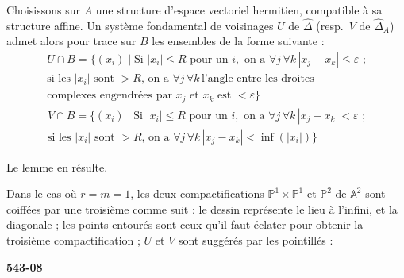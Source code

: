 \documentclass[12pt,a4paper]{article}
\begin{document}
Choisissons sur $A$ une structure d'espace vectoriel hermitien, compatible à sa structure affine. Un système fondamental de voisinages $U$ de $\widehat{\Delta}$ (resp.\ $V$ de $\widehat{\Delta}_A$) admet alors pour trace sur $B$ les ensembles de la forme suivante :
\begin{multline*}
U \cap B = \{(x_i) \mid \text{Si } |x_i| \leq R \text{ pour un } i, \text{ on a } \forall j\, \forall k\, |x_j - x_k| \leq \varepsilon \text{ ;} \\
\text{si les } |x_i| \text{ sont } > R \text{, on a } \forall j\, \forall k\, \text{l'angle entre les droites} \\
\text{complexes engendrées par } x_j \text{ et } x_k \text{ est } < \varepsilon\}
\end{multline*}
\begin{multline*}
V \cap B = \{(x_i) \mid \text{Si } |x_i| \leq R \text{ pour un } i, \text{ on a } \forall j\, \forall k\, |x_j - x_k| < \varepsilon \text{ ;} \\
\text{si les } |x_i| \text{ sont } > R \text{, on a } \forall j\, \forall k\, |x_j - x_k| < \inf(|x_i|)\}
\end{multline*}

Le lemme en résulte.

Dans le cas où $r = m = 1$, les deux compactifications $\mathbb{P}^1 \times \mathbb{P}^1$ et $\mathbb{P}^2$ de $\mathbb{A}^2$ sont coiffées par une troisième comme suit : le dessin représente le lieu à l'infini, et la diagonale ; les points entourés sont ceux qu'il faut éclater pour obtenir la troisième compactification ; $U$ et $V$ sont suggérés par les pointillés :

\newpage
\begin{flushright}
\textbf{543-08}
\end{flushright}

\begin{center}
\hspace{1cm}
\end{center}
\end{document}
